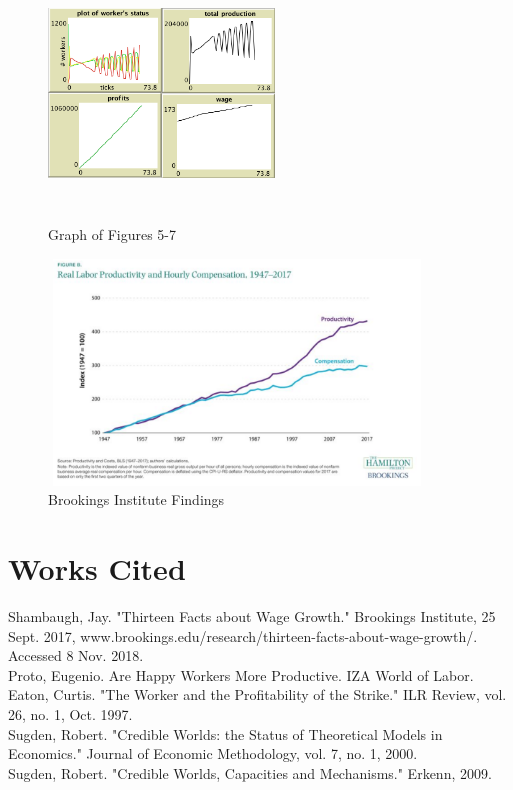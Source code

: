 \documentclass[11pt]{article}
\begin{document}
\begin{figure}[htbp]
	\centering
	\includegraphics[width=6cm, height=6cm]{graph2}
	\caption{Graph of Figures 5-7}
	\centering
	\includegraphics[width=10cm, height=6cm]{brookings}
	\caption{Brookings Institute Findings}
\end{figure}

\newpage


\section{Works Cited} \hrulefill

Shambaugh, Jay. "Thirteen Facts about Wage Growth." Brookings Institute, 25 Sept. 2017,
\qquad www.brookings.edu/research/thirteen-facts-about-wage-growth/. Accessed 8 Nov. 2018. \\

Proto, Eugenio. Are Happy Workers More Productive. IZA World of Labor. \\

Eaton, Curtis. "The Worker and the Profitability of the Strike." ILR Review, vol. 26, no. 1,
\qquad Oct. 1997. \\

Sugden, Robert. "Credible Worlds: the Status of Theoretical Models in Economics." Journal  
\qquad of Economic Methodology, vol. 7, no. 1, 2000. \\
     
     
Sugden, Robert. "Credible Worlds, Capacities and Mechanisms." Erkenn, 2009.  
\end{document}
